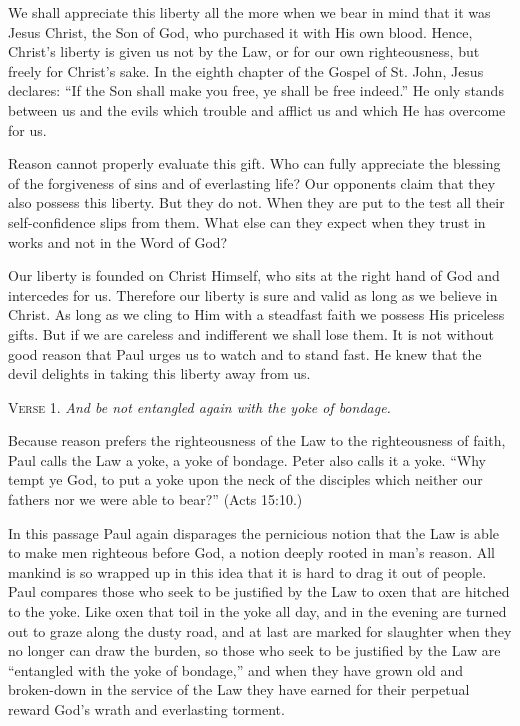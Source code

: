 We shall appreciate this liberty all the more when we bear in mind that it was Jesus Christ, the Son of God, who purchased it with His own blood. Hence, Christ’s liberty is given us not by the Law, or for our own righteousness, but freely for Christ’s sake. In the eighth chapter of the Gospel of St. John, Jesus declares: “If the Son shall make you free, ye shall be free indeed.” He only stands between us and the evils which trouble and afflict us and which He has overcome for us.

Reason cannot properly evaluate this gift. Who can fully appreciate the blessing of the forgiveness of sins and of everlasting life? Our opponents claim that they also possess this liberty. But they do not. When they are put to the test all their self-confidence slips from them. What else can they expect when they trust in works and not in the Word of God?

Our liberty is founded on Christ Himself, who sits at the right hand of God and intercedes for us. Therefore our liberty is sure and valid as long as we believe in Christ. As long as we cling to Him with a steadfast faith we possess His priceless gifts. But if we are careless and indifferent we shall lose them. It is not without good reason that Paul urges us to watch and to stand fast. He knew that the devil delights in taking this liberty away from us.

\textsc{Verse} 1. \emph{And be not entangled again with the yoke of bondage.}

Because reason prefers the righteousness of the Law to the righteousness of faith, Paul calls the Law a yoke, a yoke of bondage. Peter also calls it a yoke. “Why tempt ye God, to put a yoke upon the neck of the disciples which neither our fathers nor we were able to bear?” (Acts 15:10.)

In this passage Paul again disparages the pernicious notion that the Law is able to make men righteous before God, a notion deeply rooted in man’s reason. All mankind is so wrapped up in this idea that it is hard to drag it out of people. Paul compares those who seek to be justified by the Law to oxen that are hitched to the yoke. Like oxen that toil in the yoke all day, and in the evening are turned out to graze along the dusty road, and at last are marked for slaughter when they no longer can draw the burden, so those who seek to be justified by the Law are “entangled with the yoke of bondage,” and when they have grown old and broken-down in the service of the Law they have earned for their perpetual reward God’s wrath and everlasting torment.

